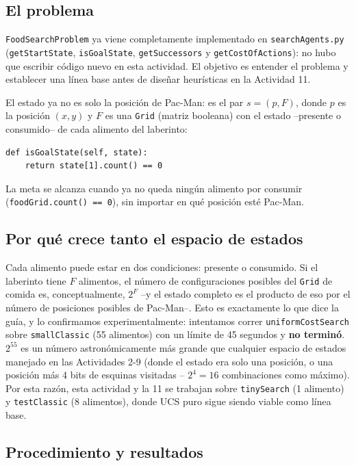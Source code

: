 \subsection{El problema}

\texttt{FoodSearchProblem} ya viene completamente implementado en \texttt{searchAgents.py}
(\texttt{getStartState}, \texttt{isGoalState}, \texttt{getSuccessors} y \texttt{getCostOfActions}):
no hubo que escribir código nuevo en esta actividad. El objetivo es entender el problema y
establecer una línea base antes de diseñar heurísticas en la Actividad 11.

El estado ya no es solo la posición de Pac-Man: es el par $s = (p, F)$, donde $p$ es la posición
$(x,y)$ y $F$ es una \texttt{Grid} (matriz booleana) con el estado --presente o consumido-- de cada
alimento del laberinto:

\begin{verbatim}
def isGoalState(self, state):
    return state[1].count() == 0
\end{verbatim}

La meta se alcanza cuando ya no queda ningún alimento por consumir (\texttt{foodGrid.count() == 0}),
sin importar en qué posición esté Pac-Man.

\subsection{Por qué crece tanto el espacio de estados}

Cada alimento puede estar en dos condiciones: presente o consumido. Si el laberinto tiene $F$
alimentos, el número de configuraciones posibles del \texttt{Grid} de comida es, conceptualmente,
$2^F$ --y el estado completo es el producto de eso por el número de posiciones posibles de
Pac-Man--. Esto es exactamente lo que dice la guía, y lo confirmamos experimentalmente: intentamos
correr \texttt{uniformCostSearch} sobre \texttt{smallClassic} (55 alimentos) con un límite de 45
segundos y \textbf{no terminó}. $2^{55}$ es un número astronómicamente más grande que cualquier
espacio de estados manejado en las Actividades 2-9 (donde el estado era solo una posición, o una
posición más 4 bits de esquinas visitadas -- $2^4 = 16$ combinaciones como máximo). Por esta razón,
esta actividad y la 11 se trabajan sobre \texttt{tinySearch} (1 alimento) y \texttt{testClassic}
(8 alimentos), donde UCS puro sigue siendo viable como línea base.

\subsection{Procedimiento y resultados}

